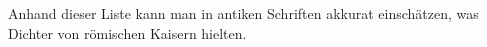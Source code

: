 \documentclass{article}
\begin{document}
	Anhand dieser Liste kann man in antiken Schriften akkurat einschätzen, was Dichter von römischen Kaisern hielten. \\
	















	
\end{document}
